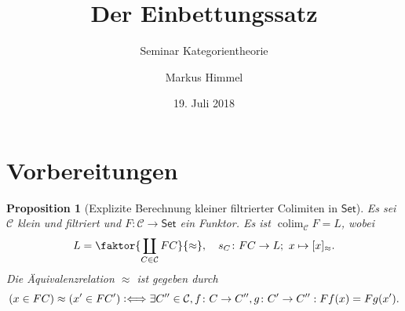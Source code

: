 \documentclass[a4paper, parskip=half]{scrartcl}
\subtitle{Seminar Kategorientheorie}
\title{Der Einbettungssatz}
\author{Markus Himmel}
\date{19. Juli 2018}
\theoremstyle{marginbreak}
\newtheorem{proposition}[remark]{Proposition}
\theoremstyle{nonumberplain}
\newcommand{\defiff}{\mathrel{\vcentcolon\Longleftrightarrow}}
\newcommand\ccat\mathsf
\newcommand\cat\mathcal
\DeclareMathOperator{\colim}{colim}
\begin{document}
	\maketitle
	\setcounter{section}{-1}

	\section{Vorbereitungen}
		\begin{proposition}[Explizite Berechnung kleiner filtrierter Colimiten in $\ccat{Set}$]
			Es sei $\cat{C}$ klein und filtriert und $F\colon \cat{C}\to\ccat{Set}$ ein
			Funktor. Es ist $\colim_\cat{C} F = L$, wobei
			\[
				L=\faktor{\coprod_{C\in\cat{C}}FC}{\approx},\quad s_C\colon FC\to L;\ x\mapsto [x]_\approx.
			\]
			Die Äquivalenzrelation $\approx$ ist gegeben durch
			\[
				(x\in FC) \approx (x'\in FC') \defiff \exists C''\in\cat{C}, f\colon C\to C'', g\colon C'\to C'': Ff(x) = Fg(x').
			\]
		\end{proposition}
\end{document}
